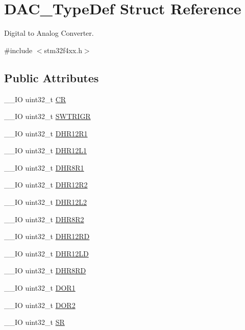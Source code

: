 \hypertarget{struct_d_a_c___type_def}{}\section{D\+A\+C\+\_\+\+Type\+Def Struct Reference}
\label{struct_d_a_c___type_def}


Digital to Analog Converter.  




{\ttfamily \#include $<$stm32f4xx.\+h$>$}

\subsection*{Public Attributes}
\begin{DoxyCompactItemize}
\item 
\+\_\+\+\_\+\+I\+O uint32\+\_\+t \hyperlink{struct_d_a_c___type_def_a394324f0b573837ca15a87127b2a37ea}{C\+R}
\item 
\+\_\+\+\_\+\+I\+O uint32\+\_\+t \hyperlink{struct_d_a_c___type_def_a4ccb66068a1ebee1179574dda20206b6}{S\+W\+T\+R\+I\+G\+R}
\item 
\+\_\+\+\_\+\+I\+O uint32\+\_\+t \hyperlink{struct_d_a_c___type_def_afbfd2855cdb81939b4efc58e08aaf3e5}{D\+H\+R12\+R1}
\item 
\+\_\+\+\_\+\+I\+O uint32\+\_\+t \hyperlink{struct_d_a_c___type_def_a5eb63912e39085e3e13d64bdb0cf38bd}{D\+H\+R12\+L1}
\item 
\+\_\+\+\_\+\+I\+O uint32\+\_\+t \hyperlink{struct_d_a_c___type_def_a3a382d341fb608a04390bacb8c00b0f0}{D\+H\+R8\+R1}
\item 
\+\_\+\+\_\+\+I\+O uint32\+\_\+t \hyperlink{struct_d_a_c___type_def_ab1f777540c487c26bf27e6fa37a644cc}{D\+H\+R12\+R2}
\item 
\+\_\+\+\_\+\+I\+O uint32\+\_\+t \hyperlink{struct_d_a_c___type_def_a9f612b6b3e065e810e5a2fb254d6a40b}{D\+H\+R12\+L2}
\item 
\+\_\+\+\_\+\+I\+O uint32\+\_\+t \hyperlink{struct_d_a_c___type_def_a3b096b71656f8fb32cd18b4c8b1d2334}{D\+H\+R8\+R2}
\item 
\+\_\+\+\_\+\+I\+O uint32\+\_\+t \hyperlink{struct_d_a_c___type_def_affa5cc9fe0cc9eb594d703bdc9d9abd9}{D\+H\+R12\+R\+D}
\item 
\+\_\+\+\_\+\+I\+O uint32\+\_\+t \hyperlink{struct_d_a_c___type_def_aea4d055e3697999b44cdcf2702d79d40}{D\+H\+R12\+L\+D}
\item 
\+\_\+\+\_\+\+I\+O uint32\+\_\+t \hyperlink{struct_d_a_c___type_def_a03f8d95bbf0ce3a53cb79506d5bf995a}{D\+H\+R8\+R\+D}
\item 
\+\_\+\+\_\+\+I\+O uint32\+\_\+t \hyperlink{struct_d_a_c___type_def_a50b4f0b0d2a376f729c8d7acf47864c3}{D\+O\+R1}
\item 
\+\_\+\+\_\+\+I\+O uint32\+\_\+t \hyperlink{struct_d_a_c___type_def_a1bde8391647d6422b39ab5ba4f13848b}{D\+O\+R2}
\item 
\+\_\+\+\_\+\+I\+O uint32\+\_\+t \hyperlink{struct_d_a_c___type_def_a1d3fd83d6ed8b2d90b471db4509b0e70}{S\+R}
\end{DoxyCompactItemize}


